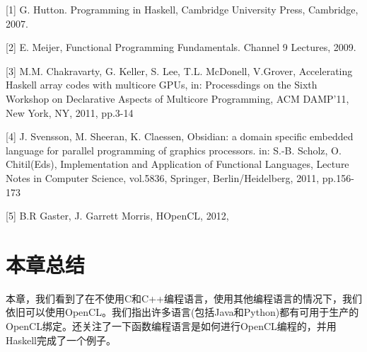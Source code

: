 \myRefRule

\begin{myRefs}

[1] G. Hutton. Programming in Haskell, Cambridge University Press, Cambridge, 2007.

[2] E. Meijer, Functional Programming Fundamentals. Channel 9 Lectures, 2009. 

[3] M.M. Chakravarty, G. Keller, S. Lee, T.L. McDonell, V.Grover, Accelerating Haskell array codes with multicore GPUs, in: Processdings on the Sixth Workshop on Declarative Aspects of Multicore Programming, ACM DAMP'11, New York, NY, 2011, pp.3-14

[4] J. Svensson, M. Sheeran, K. Claessen, Obsidian: a domain specific embedded language for parallel programming of graphics processors. in: S.-B. Scholz, O. Chitil(Eds), Implementation and Application of Functional Languages, Lecture Notes in Computer Science, vol.5836, Springer, Berlin/Heidelberg, 2011, pp.156-173

[5] B.R Gaster, J. Garrett Morris, HOpenCL, 2012, 

\end{myRefs}



\section{本章总结}

本章，我们看到了在不使用C和C++编程语言，使用其他编程语言的情况下，我们依旧可以使用OpenCL。我们指出许多语言(包括Java和Python)都有可用于生产的OpenCL绑定。还关注了一下函数编程语言是如何进行OpenCL编程的，并用Haskell完成了一个例子。


